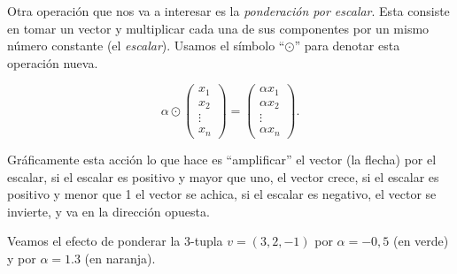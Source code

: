 \documentclass[12pt]{book}
\begin{document}
Otra operación que nos va a interesar es la \emph{ponderación por escalar}.
Esta consiste en tomar un vector y multiplicar cada una de sus componentes por un mismo número constante (el \emph{escalar}).
Usamos el símbolo ``$\odot$'' para denotar esta operación nueva.

          $$\alpha\odot \left(\begin{array}{c}x_1\\x_2\\ \vdots\\x_n\end{array}\right)=\left(\begin{array}{c}\alpha x_1\\\alpha x_2\\ \vdots\\\alpha x_n\end{array}\right).$$

Gráficamente esta acción lo que hace es ``amplificar'' el vector (la flecha) por el escalar, si el escalar es positivo y mayor que uno, el vector crece, si el escalar es positivo y menor que 1 el vector se achica, si el escalar es negativo, el vector se invierte, y va en la dirección opuesta.

Veamos el efecto de ponderar la 3-tupla $v=(3,2,-1)$ por $\alpha=-0,5$ (en verde) y por $\alpha=1.3$ (en naranja).
\end{document}
